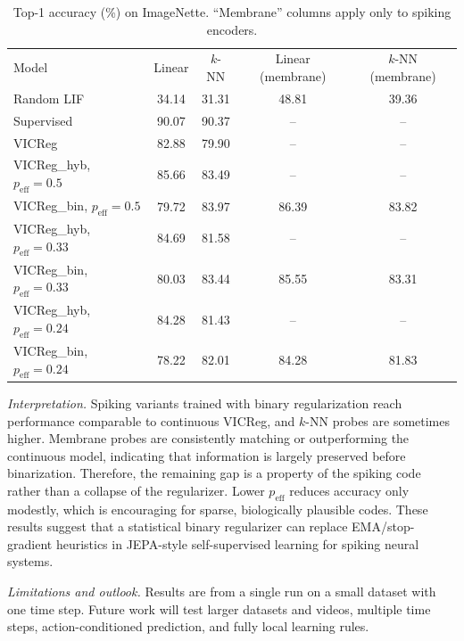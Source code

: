 \documentclass[12pt]{article}
\begin{document}
\begin{NoHyper}
    \begin{table}[h]
        \centering
        \small
        \caption{Top-1 accuracy (\%) on ImageNette. ``Membrane'' columns apply only to spiking encoders.}
        \label{tab:results}
        \begin{tabular}{lcccc}
            \toprule
            Model                         & Linear & \(k\)-NN & Linear (membrane) & \(k\)-NN (membrane) \\
            Random LIF                    & 34.14  & 31.31    & 48.81             & 39.36               \\
            Supervised                    & 90.07  & 90.37    & --                & --                  \\
            \midrule
            VICReg                        & 82.88  & 79.90    & --                & --                  \\
            VICReg\_hyb, \(p_{\text{eff}}=0.5\)  & 85.66  & 83.49    & --                & --                  \\
            VICReg\_bin, \(p_{\text{eff}}=0.5\)  & 79.72  & 83.97    & 86.39             & 83.82               \\
            \midrule
            VICReg\_hyb, \(p_{\text{eff}}=0.33\) & 84.69  & 81.58    & --                & --                  \\
            VICReg\_bin, \(p_{\text{eff}}=0.33\) & 80.03  & 83.44    & 85.55             & 83.31               \\
            \midrule
            VICReg\_hyb, \(p_{\text{eff}}=0.24\) & 84.28  & 81.43    & --                & --                  \\
            VICReg\_bin, \(p_{\text{eff}}=0.24\) & 78.22  & 82.01    & 84.28             & 81.83               \\
            \bottomrule
        \end{tabular}
    \end{table}
    \vspace{3pt}
    \emph{Interpretation.}
    Spiking variants trained with binary regularization reach performance comparable to continuous VICReg,
    and \(k\)-NN probes are sometimes higher. Membrane probes are consistently matching or outperforming the continuous model,
    indicating that information is largely preserved before binarization. Therefore, the remaining gap is a property
    of the spiking code rather than a collapse of the regularizer. Lower \(p_{\text{eff}}\) reduces accuracy
    only modestly, which is encouraging for sparse, biologically plausible codes. These results suggest
    that a statistical binary regularizer can replace EMA/stop-gradient heuristics in JEPA-style self-supervised
    learning for spiking neural systems.
    \vspace{3pt}

    \emph{Limitations and outlook.}
    Results are from a single run on a small dataset with one time step.
    Future work will test larger datasets and videos, multiple time steps,
    action-conditioned prediction, and fully local learning rules.


\end{NoHyper}
\end{document}
